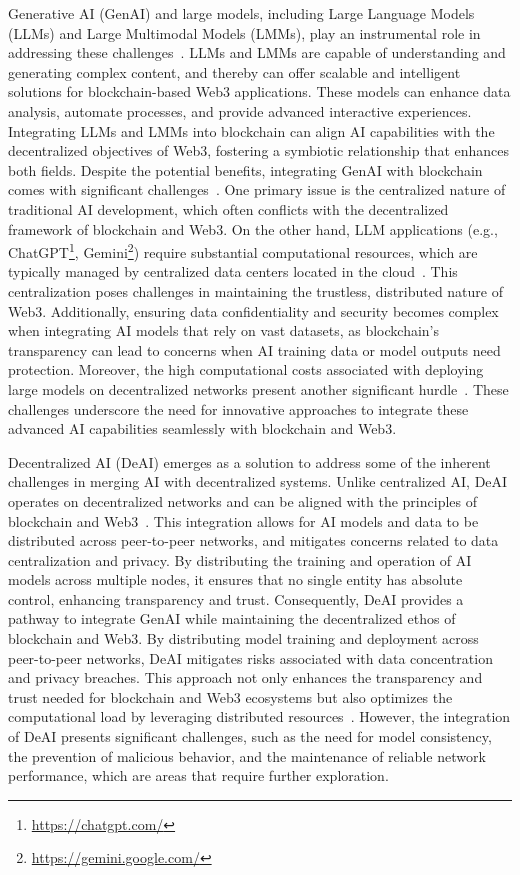 \documentclass[5p,twocolumn]{elsarticle}
\begin{document}
Generative AI (GenAI) and large models, including Large Language Models (LLMs) and Large Multimodal Models (LMMs), play an instrumental role in addressing these challenges~\cite{taylor2025examining,chang2024survey}. LLMs and LMMs are capable of understanding and generating complex content, and thereby can offer scalable and intelligent solutions for blockchain-based Web3 applications. These models can enhance data analysis, automate processes, and provide advanced interactive experiences. Integrating LLMs and LMMs into blockchain can align AI capabilities with the decentralized objectives of Web3, fostering a symbiotic relationship that enhances both fields. Despite the potential benefits, integrating GenAI with blockchain comes with significant challenges~\cite{nguyen2024generative}. One primary issue is the centralized nature of traditional AI development, which often conflicts with the decentralized framework of blockchain and Web3. On the other hand, LLM applications (e.g., ChatGPT\footnote{\url{https://chatgpt.com/}}, Gemini\footnote{\url{https://gemini.google.com/}}) require substantial computational resources, which are typically managed by centralized data centers located in the cloud~\cite{qian2024alibaba}. This centralization poses challenges in maintaining the trustless, distributed nature of Web3. Additionally, ensuring data confidentiality and security becomes complex when integrating AI models that rely on vast datasets, as blockchain's transparency can lead to concerns when AI training data or model outputs need protection. Moreover, the high computational costs associated with deploying large models on decentralized networks present another significant hurdle~\cite{chang2024survey}. These challenges underscore the need for innovative approaches to integrate these advanced AI capabilities seamlessly with blockchain and Web3.

Decentralized AI (DeAI) emerges as a solution to address some of the inherent challenges in merging AI with decentralized systems. Unlike centralized AI, DeAI operates on decentralized networks and can be aligned with the principles of blockchain and Web3~\cite{wang2024sok}. This integration allows for AI models and data to be distributed across peer-to-peer networks, and mitigates concerns related to data centralization and privacy. By distributing the training and operation of AI models across multiple nodes, it ensures that no single entity has absolute control, enhancing transparency and trust. Consequently, DeAI provides a pathway to integrate GenAI while maintaining the decentralized ethos of blockchain and Web3. By distributing model training and deployment across peer-to-peer networks, DeAI mitigates risks associated with data concentration and privacy breaches. This approach not only enhances the transparency and trust needed for blockchain and Web3 ecosystems but also optimizes the computational load by leveraging distributed resources~\cite{javadpour2024decentralized}. However, the integration of DeAI presents significant challenges, such as the need for model consistency, the prevention of malicious behavior, and the maintenance of reliable network performance, which are areas that require further exploration.
\end{document}
